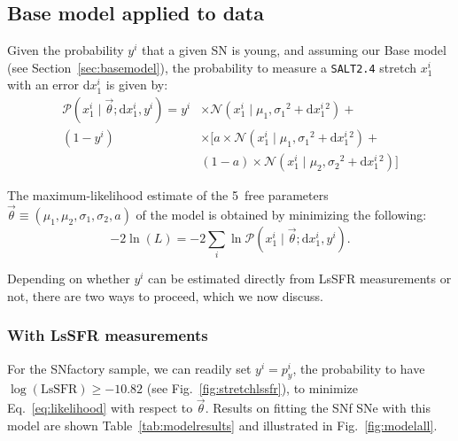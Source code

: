 \documentclass[]{aa}
\newcommand{\prob}[2]{\mathcal{P}\left( #1 \mid #2\right)}
\begin{document}
\subsection{Base model applied to data}\label{sec:basemodelapplied}

Given the probability $y^i$ that a given SN is young, and assuming our Base
model (see Section~\ref{sec:basemodel}), the probability to measure a
\textsc{\texttt{SALT2.4}} stretch $x_1^i$ with an error d$x_1^i$ is given by:
\begin{align}\label{eq:likelihoodsnf}
    \prob{x^i_1}{\vec{\theta}; \mathrm{d}x^i_1, y^i} =
    y^i & \times
    \mathcal{N}\left(x^i_1 \mid \mu_1, \sigma_1{}^2+\mathrm{d}x^i_1{}^2\right) +
    \nonumber\\
    (1-y^i) &\times \bigg[
    a \times \mathcal{N}\left(x^i_1 \mid \mu_1,
    \sigma_1{}^2+\mathrm{d}x^i_1{}^2\right) +
    \nonumber\\
    & (1-a) \times \mathcal{N}\left(x^i_1 \mid \mu_2,
    \sigma_2{}^{2}+\mathrm{d}x^i_1{}^2\right) \bigg]
\end{align}

The maximum-likelihood estimate of the 5~free parameters
$\vec{\theta}\equiv({\mu_1,\mu_2,\sigma_1,\sigma_2,a})$ of the model is obtained
by minimizing the following:
\begin{equation}\label{eq:likelihood}
    -2\ln(L) = -2 \sum_i \ln \prob{x_1^i}{\vec{\theta};
    \mathrm{d}x_1^i, y^i}.
\end{equation}

Depending on whether $y^i$ can be estimated directly from LsSFR measurements or
not, there are two ways to proceed, which we now discuss.

\subsubsection{With LsSFR measurements}\label{sec:modelpy}

For the SNfactory sample, we can readily set $y^i = p^i_y$, the probability to
have $\log(\textrm{LsSFR}) \geq -10.82$ (see Fig.~\ref{fig:stretchlssfr}), to
minimize Eq.~\ref{eq:likelihood} with respect to $\vec{\theta}$. Results on
fitting the SNf SNe with this model are shown Table~\ref{tab:modelresults} and
illustrated in Fig.~\ref{fig:modelall}.
\end{document}
